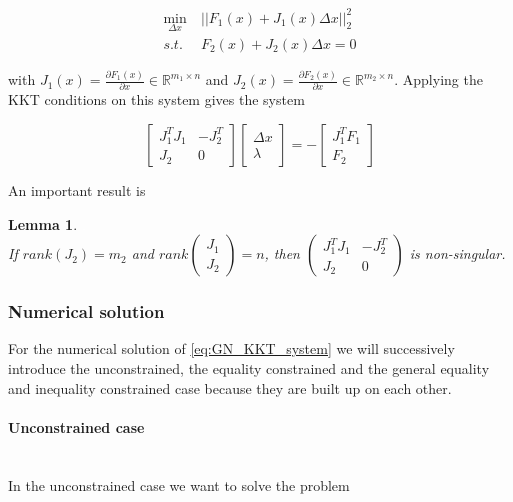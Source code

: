 \documentclass{scrartcl}[12pt, halfparskip]
\newtheorem{Lemma}{Lemma}
\begin{document}
\begin{align}
\min_{\Delta x} \ & || F_1(x) + J_1(x) \Delta x ||_2^2 \\
s.t. \ & F_2(x) + J_2(x) \Delta x = 0 \nonumber
\end{align}

with $J_1(x) = \frac{\partial F_1(x)}{\partial x} \in \mathbb{R}^{m_1 \times n}$ and $J_2(x) = \frac{\partial F_2(x)}{\partial x} \in \mathbb{R}^{m_2 \times n}$. Applying the KKT conditions on this system gives the system

\begin{equation}
	\begin{bmatrix}
		J_1^T J_1 & -J_2^T \\
		J_2 & 0
	\end{bmatrix}
	\begin{bmatrix}
		\Delta x \\
		\lambda
	\end{bmatrix}
	= -
	\begin{bmatrix}
	J_1^T F_1 \\
	F_2
	\end{bmatrix}
	\label{eq:GN_KKT_system}
\end{equation}


An important result is

\begin{Lemma} \textcolor{white}{.}\\
	If $rank(J_2) = m_2$ and $rank 
	\begin{pmatrix}
	J_1 \\
	J_2
	\end{pmatrix}
	= n$,
	then 	
	$\begin{pmatrix}
		J_1^T J_1 & -J_2^T \\
		J_2 & 0
	\end{pmatrix}$
	is non-singular.
\end{Lemma}

\subsubsection{Numerical solution}
For the numerical solution of \eqref{eq:GN_KKT_system} we will successively introduce the unconstrained, the equality constrained and the general equality and inequality constrained case because they are built up on each other.

\paragraph{Unconstrained case}\mbox{}\\
In the unconstrained case we want to solve the problem
\end{document}
